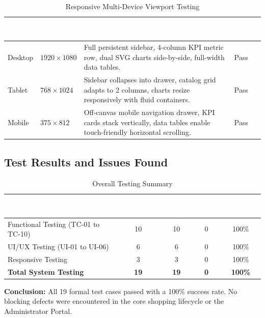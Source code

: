 \documentclass[12pt,a4paper,oneside]{report}
\begin{document}
\begin{table}[H]
\centering
\small
\begin{tabular}{|p{2.0cm}|p{2.6cm}|p{8.9cm}|p{1.4cm}|}
\hline
\rowcolor{PrimaryBrown}
\textcolor{white}{\textbf{Device}} & \textcolor{white}{\textbf{Viewport}} & \textcolor{white}{\textbf{Checked Behavior \& Layout Adaptation}} & \textcolor{white}{\textbf{Result}} \\
\hline
Desktop & $1920 \times 1080$ & Full persistent sidebar, 4-column KPI metric row, dual SVG charts side-by-side, full-width data tables. & Pass \\
\hline
Tablet & $768 \times 1024$ & Sidebar collapses into drawer, catalog grid adapts to 2 columns, charts resize responsively with fluid containers. & Pass \\
\hline
Mobile & $375 \times 812$ & Off-canvas mobile navigation drawer, KPI cards stack vertically, data tables enable touch-friendly horizontal scrolling. & Pass \\
\hline
\end{tabular}
\caption{Responsive Multi-Device Viewport Testing}
\end{table}

\subsection{Test Results and Issues Found}
\begin{table}[H]
\centering
\begin{tabular}{|p{5.8cm}|c|c|c|c|}
\hline
\rowcolor{PrimaryBrown}
\textcolor{white}{\textbf{Test Group}} & \textcolor{white}{\textbf{Total Cases}} & \textcolor{white}{\textbf{Passed}} & \textcolor{white}{\textbf{Failed}} & \textcolor{white}{\textbf{Pass Rate}} \\
\hline
Functional Testing (TC-01 to TC-10) & 10 & 10 & 0 & 100\% \\
\hline
UI/UX Testing (UI-01 to UI-06) & 6 & 6 & 0 & 100\% \\
\hline
Responsive Testing & 3 & 3 & 0 & 100\% \\
\hline
\textbf{Total System Testing} & \textbf{19} & \textbf{19} & \textbf{0} & \textbf{100\%} \\
\hline
\end{tabular}
\caption{Overall Testing Summary}
\end{table}

\textbf{Conclusion:} All 19 formal test cases passed with a 100\% success rate. No blocking defects were encountered in the core shopping lifecycle or the Administrator Portal.
\end{document}
